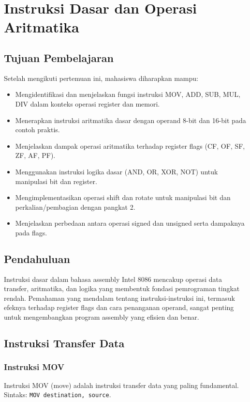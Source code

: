 \documentclass[../main.tex]{subfiles}
\begin{document}
\chapter{Instruksi Dasar dan Operasi Aritmatika}\label{ch:instruksi-dasar}

\section{Tujuan Pembelajaran}\label{sec:instruksi-dasar-tujuan}
Setelah mengikuti pertemuan ini, mahasiswa diharapkan mampu:
\begin{itemize}
    \item Mengidentifikasi dan menjelaskan fungsi instruksi MOV, ADD, SUB, MUL, DIV dalam konteks operasi register dan memori.
    \item Menerapkan instruksi aritmatika dasar dengan operand 8-bit dan 16-bit pada contoh praktis.
    \item Menjelaskan dampak operasi aritmatika terhadap register flags (CF, OF, SF, ZF, AF, PF).
    \item Menggunakan instruksi logika dasar (AND, OR, XOR, NOT) untuk manipulasi bit dan register.
    \item Mengimplementasikan operasi shift dan rotate untuk manipulasi bit dan perkalian/pembagian dengan pangkat 2.
    \item Menjelaskan perbedaan antara operasi signed dan unsigned serta dampaknya pada flags.
\end{itemize}

\section{Pendahuluan}\label{sec:instruksi-dasar-pendahuluan}
Instruksi dasar dalam bahasa assembly Intel 8086 mencakup operasi data transfer, aritmatika, dan logika yang membentuk fondasi pemrograman tingkat rendah. Pemahaman yang mendalam tentang instruksi-instruksi ini, termasuk efeknya terhadap register flags dan cara penanganan operand, sangat penting untuk mengembangkan program assembly yang efisien dan benar.

\section{Instruksi Transfer Data}\label{sec:instruksi-dasar-transfer}
\subsection{Instruksi MOV}
Instruksi MOV (move) adalah instruksi transfer data yang paling fundamental. Sintaks: \texttt{MOV destination, source}.
\end{document}
